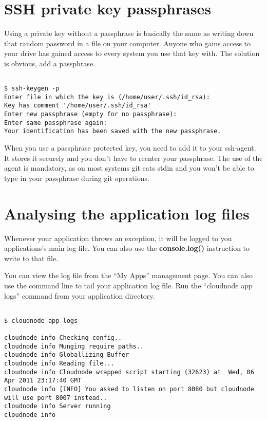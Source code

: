 \section{SSH private key passphrases}
\label{sshprivatekeypassphrases}

Using a private key without a passphrase is basically the same as writing down that random password in a file on your computer. Anyone who gains access to your drive has gained access to every system you use that key with. The solution is obvious, add a passphrase.

\begin{adjustwidth}{2.5em}{2.5em}
\begin{verbatim}

$ ssh-keygen -p
Enter file in which the key is (/home/user/.ssh/id_rsa):
Key has comment '/home/user/.ssh/id_rsa'
Enter new passphrase (empty for no passphrase):
Enter same passphrase again:
Your identification has been saved with the new passphrase.

\end{verbatim}
\end{adjustwidth}

When you use a passphrase protected key, you need to add it to your ssh-agent. It stores it securely and you don't have to reenter your passphrase. The use of the agent is mandatory, as on most systems git eats stdin and you won't be able to type in your passphrase during git operations. 



\section{Analysing the application log files}
\label{analysingtheapplicationlogfiles}

Whenever your application throws an exception, it will be logged to you applications's
 main log file. You can also use the \textbf{console.log()} instruction to write to that file.

You can view the log file from the ``My Apps'' management page. You can also use the command line
to tail your application log file. Run the ``cloudnode app logs'' command from your application directory.

\begin{adjustwidth}{2.5em}{2.5em}
\begin{verbatim}

$ cloudnode app logs

cloudnode info Checking config..
cloudnode info Munging require paths..
cloudnode info Globallizing Buffer
cloudnode info Reading file...
cloudnode info Cloudnode wrapped script starting (32623) at  Wed, 06 Apr 2011 23:17:40 GMT
cloudnode info [INFO] You asked to listen on port 8080 but cloudnode will use port 8007 instead..
cloudnode info Server running
cloudnode info

\end{verbatim}
\end{adjustwidth}

